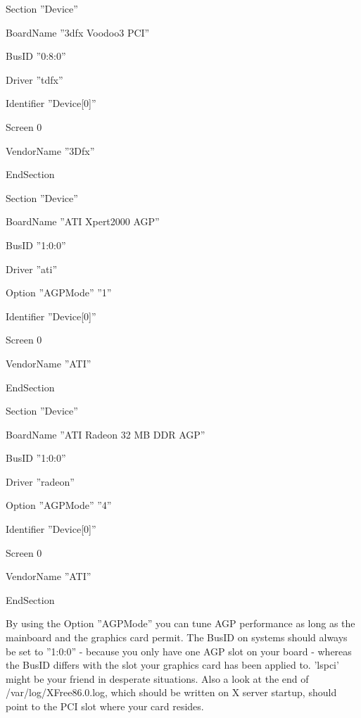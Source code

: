 \begin{ttfamily}
\noindent
  Section ''Device''
    
  
    BoardName  	''3dfx Voodoo3 PCI'' 
        
    BusID  	''0:8:0''
        
    Driver  	''tdfx''
    
    Identifier  ''Device[0]''
    
    Screen  	0
    
    VendorName  ''3Dfx''
    
 
\noindent   
  EndSection
  \medskip

\noindent   
  Section ''Device''
  
  
    BoardName  	''ATI Xpert2000 AGP''
    
    BusID  	''1:0:0''
    
    Driver  	''ati''
    
    Option	''AGPMode'' ''1''
    
    Identifier  ''Device[0]''
    
    Screen  	0
    
    VendorName  ''ATI''
    
 \noindent   
  EndSection
 \medskip

\noindent   
  Section ''Device''
  
    BoardName    ''ATI Radeon 32 MB DDR AGP''
    
    BusID        ''1:0:0''
    
    Driver       ''radeon''
    
    Option	 ''AGPMode'' ''4''
    
    Identifier   ''Device[0]''
    
    Screen       0
    
    VendorName   ''ATI''
    
\noindent   
  EndSection
  \medskip
  \end{ttfamily}

By using the Option ''AGPMode'' you can tune AGP performance as long as the
mainboard and the graphics card permit. The BusID on  systems should
always be set to ''1:0:0'' - because you only have one AGP slot on your board
- whereas the  BusID differs with the slot your graphics card has been
applied to. 'lspci' might be your friend in desperate situations. Also a
look at the end of /var/log/XFree86.0.log, which should be written on X
server startup, should point to the PCI slot where your card resides.

